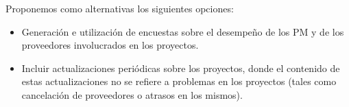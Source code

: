 Proponemos como alternativas los siguientes opciones:
\begin{itemize}
	\item Generación e utilización de encuestas sobre el desempeño de los PM y de los proveedores involucrados en los proyectos.
	\item Incluir actualizaciones periódicas sobre los proyectos, donde el contenido de estas actualizaciones no se refiere a problemas en los proyectos (tales como cancelación de proveedores o atrasos en los mismos).
\end{itemize}
